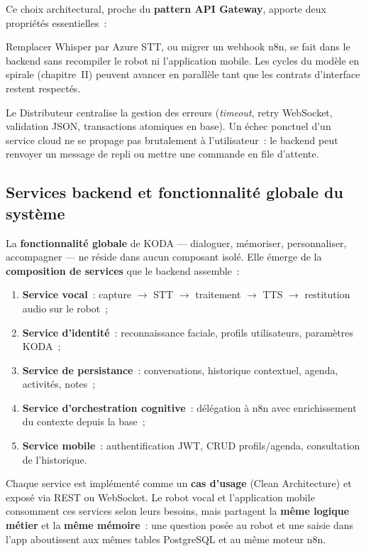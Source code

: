 \documentclass[a4paper,12pt]{report}
\begin{document}
	Ce choix architectural, proche du \textbf{pattern API Gateway}, apporte deux
	propriétés essentielles~:
	\begin{description}[leftmargin=!, style=nextline, itemsep=0.4em]
		\item[\textbf{Flexibilité}] Remplacer Whisper par Azure STT, ou migrer un webhook
		n8n, se fait dans le backend sans recompiler le robot ni l'application mobile.
		Les cycles du modèle en spirale (chapitre~II) peuvent avancer en parallèle tant
		que les contrats d'interface restent respectés.
		\item[\textbf{Disponibilité}] Le Distributeur centralise la gestion des erreurs
		(\textit{timeout}, retry WebSocket, validation JSON, transactions atomiques en
		base). Un échec ponctuel d'un service cloud ne se propage pas brutalement à
		l'utilisateur~: le backend peut renvoyer un message de repli ou mettre une
		commande en file d'attente.
	\end{description}
	
	\subsection{Services backend et fonctionnalité globale du système}
	
	La \textbf{fonctionnalité globale} de KODA --- dialoguer, mémoriser, personnaliser,
	accompagner --- ne réside dans aucun composant isolé. Elle émerge de la
	\textbf{composition de services} que le backend assemble~:
	\begin{enumerate}[leftmargin=*, itemsep=0.3em]
		\item \textbf{Service vocal}~: capture $\rightarrow$ STT $\rightarrow$ traitement
		$\rightarrow$ TTS $\rightarrow$ restitution audio sur le robot~;
		\item \textbf{Service d'identité}~: reconnaissance faciale, profils utilisateurs,
		paramètres KODA~;
		\item \textbf{Service de persistance}~: conversations, historique contextuel,
		agenda, activités, notes~;
		\item \textbf{Service d'orchestration cognitive}~: délégation à n8n avec enrichissement
		du contexte depuis la base~;
		\item \textbf{Service mobile}~: authentification JWT, CRUD profils/agenda,
		consultation de l'historique.
	\end{enumerate}
	Chaque service est implémenté comme un \textbf{cas d'usage} (Clean Architecture) et
	exposé via REST ou WebSocket. Le robot vocal et l'application mobile consomment ces
	services selon leurs besoins, mais partagent la \textbf{même logique métier} et la
	\textbf{même mémoire}~: une question posée au robot et une saisie dans l'app aboutissent
	aux mêmes tables PostgreSQL et au même moteur n8n.
	
\end{document}
